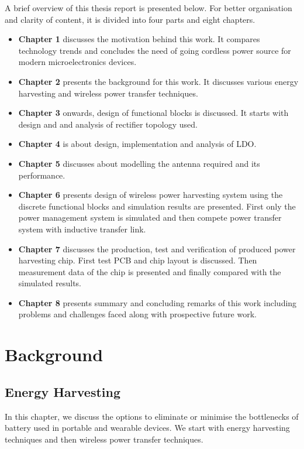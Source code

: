 \documentclass[UKenglish]{ifimaster}  %
\begin{document}
A brief overview of this thesis report is presented below. For better organisation and clarity of content, it is divided into four parts 
and eight chapters. 
\begin{itemize}
\item \textbf{Chapter 1} discusses the motivation behind this work. It compares technology trends and concludes
the need of going cordless power source for modern microelectronics devices.
\item \textbf{Chapter 2} presents the background for this work. It discusses various energy harvesting and 
wireless power transfer techniques.
\item \textbf{Chapter 3} onwards, design of functional blocks is discussed. It starts with design and 
and analysis of rectifier topology used.
\item \textbf{Chapter 4} is about design, implementation and analysis of LDO.
\item \textbf{Chapter 5} discusses about modelling the antenna required and its performance. 
\item \textbf{Chapter 6} presents design of wireless power harvesting system using the discrete functional blocks and simulation 
results are presented. First only the power management system is simulated and then compete power transfer system with 
inductive transfer link.
\item \textbf{Chapter 7} discusses the production, test and verification of produced power harvesting chip. First test PCB and 
chip layout is discussed. Then measurement data of the chip is presented and finally compared with the simulated results.
\item \textbf{Chapter 8} presents summary and concluding remarks of this work including problems and challenges faced 
along with prospective future work.

\end{itemize}




\chapter{Background}

\section{Energy Harvesting}

In this chapter, we discuss the options to eliminate or minimise the bottlenecks of battery used in portable and 
wearable devices. We start with energy harvesting techniques and then wireless power transfer techniques. \\
\end{document}
